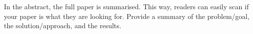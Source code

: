 In the abstract, the full paper is summarised. This way, readers can easily scan if your paper is what they are looking for. Provide a summary of the problem/goal, the solution/approach, and the results.